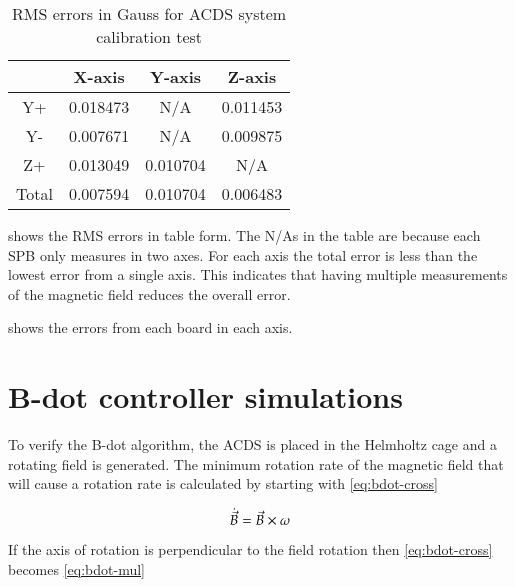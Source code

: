 \begin{table}[!ht]
    \centering
    \caption{RMS errors in Gauss for \ac{ACDS} system calibration test}
    \label{tab:tcalMSPerr}
    \begin{tabular}{|c|c|c|c|}
        \hline
        &X-axis&Y-axis&Z-axis\\
        \hline
        Y+&0.018473&N/A&0.011453\\
        \hline
        Y-&0.007671&N/A&0.009875\\
        \hline
        Z+&0.013049&0.010704&N/A\\
        \hline
        Total&0.007594&0.010704&0.006483\\
        \hline
    \end{tabular}
\end{table}

 shows the RMS errors in table form. The N/As in the table are because each \ac{SPB} only measures in two axes. For each axis the total error is less than the lowest error from a single axis. This indicates that having multiple measurements of the magnetic field reduces the overall error.


 shows the errors from each board in each axis.

\section{B-dot controller simulations}

To verify the B-dot algorithm, the \ac{ACDS} is placed in the Helmholtz cage and a rotating field is generated. The minimum rotation rate of the magnetic field that will cause a rotation rate is calculated by starting with \cref{eq:bdot-cross}

\begin{equation}
    \dot{\vec{B}} = \vec{B} \times \omega
    \label{eq:bdot-cross}
\end{equation}

If the axis of rotation is perpendicular to the field rotation then \cref{eq:bdot-cross} becomes \cref{eq:bdot-mul}

